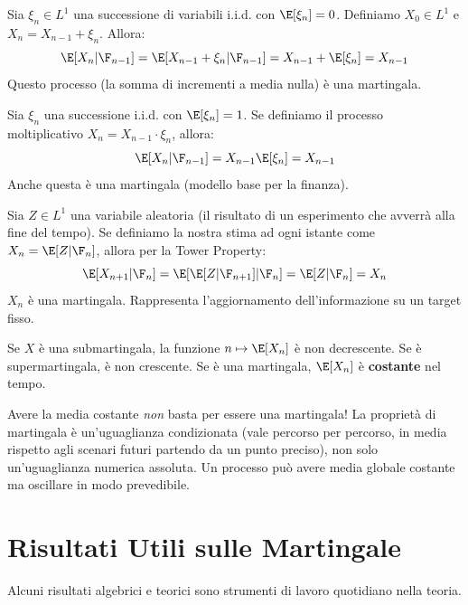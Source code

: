 \begin{esempio}
Sia $\xi_n \in L^1$ una successione di variabili i.i.d. con $\E[\xi_n] = 0$. Definiamo $X_0 \in L^1$ e $X_n = X_{n-1} + \xi_n$. Allora:
\[ \E[X_n | \F_{n-1}] = \E[X_{n-1} + \xi_n | \F_{n-1}] = X_{n-1} + \E[\xi_n] = X_{n-1} \]
Questo processo (la somma di incrementi a media nulla) è una martingala.
\end{esempio}

\begin{esempio}
Sia $\xi_n$ una successione i.i.d. con $\E[\xi_n] = 1$. Se definiamo il processo moltiplicativo $X_n = X_{n-1} \cdot \xi_n$, allora:
\[ \E[X_n | \F_{n-1}] = X_{n-1} \E[\xi_n] = X_{n-1} \]
Anche questa è una martingala (modello base per la finanza).
\end{esempio}

\begin{esempio}
Sia $Z \in L^1$ una variabile aleatoria (il risultato di un esperimento che avverrà alla fine del tempo). Se definiamo la nostra stima ad ogni istante come $X_n = \E[Z | \F_n]$, allora per la Tower Property:
\[ \E[X_{n+1} | \F_n] = \E[\E[Z | \F_{n+1}] | \F_n] = \E[Z | \F_n] = X_n \]
$X_n$ è una martingala. Rappresenta l'aggiornamento dell'informazione su un target fisso.
\end{esempio}

\begin{theorem}
Se $X$ è una submartingala, la funzione $n \mapsto \E[X_n]$ è non decrescente.
Se è supermartingala, è non crescente.
Se è una martingala, $\E[X_n]$ è \textbf{costante} nel tempo.
\end{theorem}
\begin{hint}
Avere la media costante \emph{non} basta per essere una martingala! La proprietà di martingala è un'uguaglianza condizionata (vale percorso per percorso, in media rispetto agli scenari futuri partendo da un punto preciso), non solo un'uguaglianza numerica assoluta. Un processo può avere media globale costante ma oscillare in modo prevedibile.
\end{hint}

\section{Risultati Utili sulle Martingale}

Alcuni risultati algebrici e teorici sono strumenti di lavoro quotidiano nella teoria.

